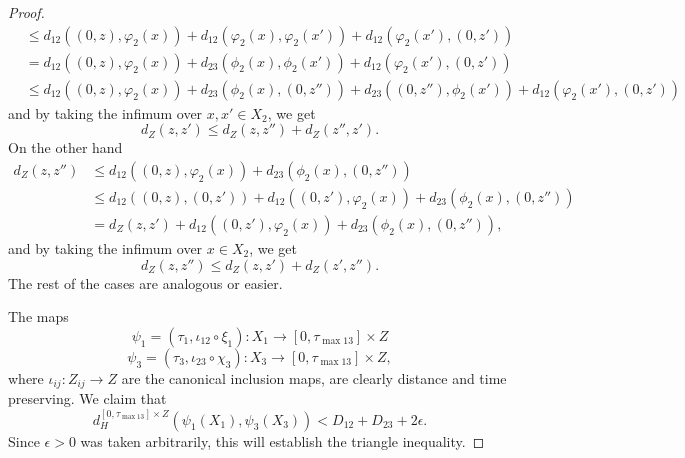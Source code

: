 \documentclass[a4paper,12pt,reqno]{amsart}
\theoremstyle{plain}
\newcommand{\be}{\begin{equation}}
\newcommand{\ee}{\end{equation}}
\begin{document}
\begin{proof}
\begin{align*}
&\leq d_{12}((0,z),\varphi_2(x)) + d_{12}(\varphi_2(x),\varphi_2(x')) + d_{12}(\varphi_2(x'),(0,z'))\\
&= d_{12}((0,z),\varphi_2(x)) + d_{23}(\phi_2(x),\phi_2(x')) + d_{12}(\varphi_2(x'),(0,z'))\\
&\leq d_{12}((0,z),\varphi_2(x)) + d_{23}(\phi_2(x),(0,z''))+d_{23}((0,z''),\phi_2(x')) + d_{12}(\varphi_2(x'),(0,z'))
\end{align*}
and by taking the infimum over $x,x'\in X_2$, we get
\[
d_Z(z,z') \leq d_Z(z,z'')+d_Z(z'',z').
\]
On the other hand
\begin{align*}
d_Z(z,z'') &\leq  d_{12}((0,z),\varphi_2(x)) + d_{23}(\phi_2(x),(0,z'')) \\
&\leq d_{12}((0,z),(0,z')) + d_{12}((0,z'),\varphi_2(x)) + d_{23}(\phi_2(x),(0,z'')) \\
&= d_Z(z,z') + d_{12}((0,z'),\varphi_2(x)) + d_{23}(\phi_2(x),(0,z'')), 
\end{align*}
and by taking the infimum over $x\in X_2$, we get
\[
d_Z(z,z'') \leq d_Z(z,z')+d_Z(z',z'').
\]
The rest of the cases are analogous or easier. 


The maps
\be
\psi_1=(\tau_1, \iota_{12} \circ \xi_1): X_1 \to [0, \tau_{\max 13}]\times Z 
\ee
\be
\psi_3=(\tau_3, \iota_{23} \circ\chi_3): X_3 \to [0, \tau_{\max 13}]\times Z,  
\ee
where $\iota_{ij}: Z_{ij} \to Z$ are the canonical inclusion maps, are clearly distance and time preserving.  We claim that
\be
d_{H}^{[0, \tau_{\max 13}]\times Z} ( \psi_1(X_1), \psi_3(X_3)) < D_{12}+ D_{23}+ 2\epsilon.
\ee
Since $\epsilon>0$ was taken arbitrarily, this will establish the triangle inequality.




\end{proof}
\end{document}
